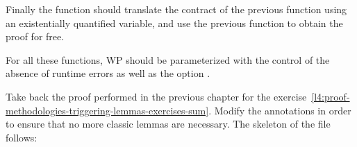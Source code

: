 Finally the function  should translate the contract
of the previous function using an existentially quantified variable, and use the
previous function to obtain the proof for free.


For all these functions, WP should be parameterized with the control of the
absence of runtime errors as well as the option
.




Take back the proof performed in the previous chapter for the
exercise~\ref{l4:proof-methodologies-triggering-lemmas-exercises-sum}. Modify
the annotations in order to ensure that no more classic lemmas are necessary.
The skeleton of the file follows:


